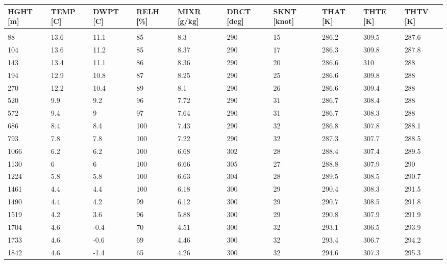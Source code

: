 \documentclass{article}
\begin{document}
\small{\begin{longtable}[h!]{p{}|p{}|p{}|p{}|p{}|p{}|p{}|p{}|p{}|p{}}
    \multicolumn{1}{l}{HGHT [m]} & \multicolumn{1}{l}{TEMP [C]} & \multicolumn{1}{l}{DWPT [C] } & \multicolumn{1}{l}{RELH [\%]} & \multicolumn{1}{l}{MIXR [g/kg]} & \multicolumn{1}{l}{DRCT [deg]} & \multicolumn{1}{l}{SKNT [knot]} & \multicolumn{1}{l}{THAT [K]} & \multicolumn{1}{l}{ THTE [K]} & \multicolumn{1}{l}{THTV [K]} \\ \hline
      &   &   &   &   &   &   &   &   &  \\
    88 & 13.6 & 11.1 & 85 & 8.3 & 290 & 15 & 286.2 & 309.5 & 287.6 \\
    104 & 13.6 & 11.2 & 85 & 8.37 & 290 & 17 & 286.3 & 309.8 & 287.8 \\
    143 & 13.4 & 11.1 & 86 & 8.36 & 290 & 20 & 286.6 & 310 & 288 \\
    194 & 12.9 & 10.8 & 87 & 8.25 & 290 & 25 & 286.6 & 309.8 & 288 \\
    270 & 12.2 & 10.4 & 89 & 8.1 & 290 & 26 & 286.6 & 309.4 & 288 \\
    520 & 9.9 & 9.2 & 96 & 7.72 & 290 & 31 & 286.7 & 308.4 & 288 \\
    572 & 9.4 & 9 & 97 & 7.64 & 290 & 31 & 286.7 & 308.3 & 288 \\
    686 & 8.4 & 8.4 & 100 & 7.43 & 290 & 32 & 286.8 & 307.8 & 288.1 \\
    793 & 7.8 & 7.8 & 100 & 7.22 & 290 & 32 & 287.3 & 307.7 & 288.5 \\
    1066 & 6.2 & 6.2 & 100 & 6.68 & 302 & 28 & 288.4 & 307.4 & 289.5 \\
    1130 & 6 & 6 & 100 & 6.66 & 305 & 27 & 288.8 & 307.9 & 290 \\
    1224 & 5.8 & 5.8 & 100 & 6.63 & 304 & 28 & 289.5 & 308.5 & 290.7 \\
    1461 & 4.4 & 4.4 & 100 & 6.18 & 300 & 29 & 290.4 & 308.3 & 291.5 \\
    1490 & 4.4 & 4.2 & 99 & 6.12 & 300 & 29 & 290.7 & 308.5 & 291.8 \\
    1519 & 4.2 & 3.6 & 96 & 5.88 & 300 & 29 & 290.8 & 307.9 & 291.9 \\
    1704 & 4.6 & -0.4 & 70 & 4.51 & 300 & 32 & 293.1 & 306.5 & 293.9 \\
    1733 & 4.6 & -0.6 & 69 & 4.46 & 300 & 32 & 293.4 & 306.7 & 294.2 \\
    1842 & 4.6 & -1.4 & 65 & 4.26 & 300 & 32 & 294.6 & 307.3 & 295.3 \\

\end{longtable}}
\end{document}

